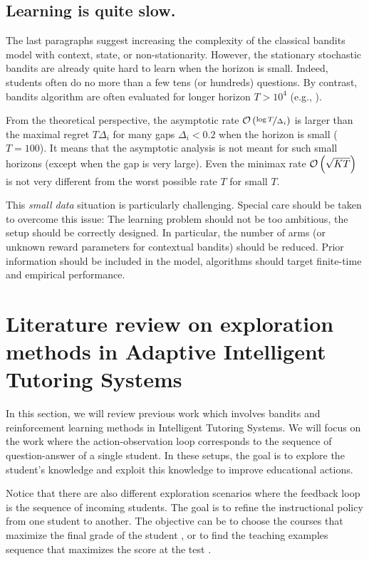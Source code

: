\subsection{Learning is quite slow.}
The last paragraphs suggest increasing the complexity of the classical bandits model with context, state, or non-stationarity. However, the stationary stochastic bandits are already quite hard to learn when the horizon is small. Indeed, students often do no more than a few tens (or hundreds) questions. By contrast, bandits algorithm are often evaluated for longer horizon $T > 10^4$ (e.g., \citet{chapelle2011empirical}). 

From the theoretical perspective, the asymptotic rate $\mathcal{O}\left(\nicefrac{\log T}{\Delta_i}\right)$ is larger than the maximal regret $T\Delta_i$ for many gaps $\Delta_i < 0.2$ when the horizon is small ($T=100$). It means that the asymptotic analysis is not meant for such small horizons (except when the gap is very large). Even the minimax rate $\mathcal{O}\left(\sqrt{KT}\right)$ is not very different from the worst possible rate $T$ for small $T$.

This \emph{small data} situation is particularly challenging. Special care should be taken to overcome this issue: The learning problem should not be too ambitious, the setup should be correctly designed. In particular, the number of arms (or unknown reward parameters for contextual bandits) should be reduced. Prior information should be included in the model, algorithms should target finite-time and empirical performance.

\section{Literature review on exploration methods in Adaptive Intelligent Tutoring Systems}
\label{sec:bandits4ITS}

In this section, we will review previous work which involves bandits and reinforcement learning methods in Intelligent Tutoring Systems.  We will focus on the work where the action-observation loop corresponds to the sequence of question-answer of a single student. In these setups, the goal is to explore the student's knowledge and exploit this knowledge to improve educational actions.

Notice that there are also different exploration scenarios where the feedback loop is the sequence of incoming students. The goal is to refine the instructional policy from one student to another. The objective can be to choose the courses that maximize the final grade of the student \citep{xu2016personalized, lan2016contextual}, or to find the teaching examples sequence that maximizes the score at the test \citep{lindsey2013optimizing}.

